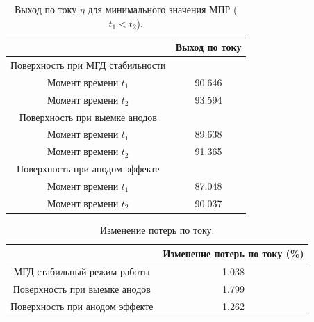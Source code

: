 \documentclass{article}
\begin{document}
\begin{table}[ht]
\centering
\begin{tabular}{|c|c|}
\hline
			&Выход по току	\\
\hline
Поверхность при МГД стабильности &	\\
Момент времени $t_1$			&90.646	\\ 
Момент времени $t_2$		&93.594	\\  
\hline
Поверхность при выемке анодов &	\\
Момент времени $t_1$		&89.638	\\  
Момент времени $t_2$		&91.365	\\  
\hline
Поверхность при анодом эффекте &	\\
Момент времени $t_1$	&87.048	\\  
Момент времени $t_2$	&90.037	\\  
\hline
\end{tabular}
\caption{Выход по току $\eta$ для минимального значения МПР ($t_1 < t_2$). \label{table:vichPoToku}}
\end{table}


\begin{table}[ht]
\centering
\begin{tabular}{|c|c|}
\hline
			& Изменение потерь по току (\%)\\
\hline
МГД стабильный режим работы & 1.038	\\
\hline
Поверхность при выемке анодов &	1.799\\
\hline
Поверхность при анодом эффекте & 1.262	\\
\hline
\end{tabular}
\caption{Изменение потерь по току. \label{table:ismineniep}}
\end{table}
\end{document}
